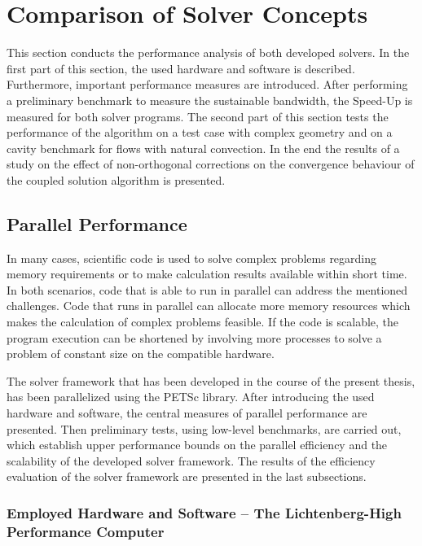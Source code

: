 \section{Comparison of Solver Concepts}
\label{sec:compare}

This section conducts the performance analysis of both developed solvers. In the first part of this section, the used hardware and software is described. Furthermore, important performance measures are introduced. After performing a preliminary benchmark to measure the sustainable bandwidth, the Speed-Up is measured for both solver programs. The second part of this section tests the performance of the algorithm on a test case with complex geometry and on a cavity benchmark for flows with natural convection. In the end the results of a study on the effect of non-orthogonal corrections on the convergence behaviour of the coupled solution algorithm is presented.
  
\subsection{Parallel Performance}

In many cases, scientific code is used to solve complex problems regarding memory requirements or to make calculation results available within short time. In both scenarios, code that is able to run in parallel can address the mentioned challenges. Code that runs in parallel can allocate more memory resources which makes the calculation of complex problems feasible. If the code is scalable, the program execution can be shortened by involving more processes to solve a problem of constant size on the compatible hardware.

The solver framework that has been developed in the course of the present thesis, has been parallelized using the PETSc library. After introducing the used hardware and software, the central measures of parallel performance are presented. Then preliminary tests, using low-level benchmarks, are carried out, which establish upper performance bounds on the parallel efficiency and the scalability of the developed solver framework. The results of the efficiency evaluation of the solver framework are presented in the last subsections.

\subsubsection{Employed Hardware and Software -- The Lichtenberg-High Performance Computer }
\label{sec:hhlr}

